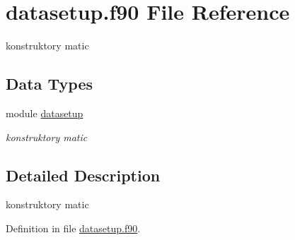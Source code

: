 \hypertarget{datasetup_8f90}{\section{datasetup.\-f90 \-File \-Reference}
\label{datasetup_8f90}
}


konstruktory matic  


\subsection*{\-Data \-Types}
\begin{DoxyCompactItemize}
\item 
module \hyperlink{classdatasetup}{datasetup}
\begin{DoxyCompactList}\small\item\em konstruktory matic \end{DoxyCompactList}\end{DoxyCompactItemize}


\subsection{\-Detailed \-Description}
konstruktory matic 

\-Definition in file \hyperlink{datasetup_8f90_source}{datasetup.\-f90}.

